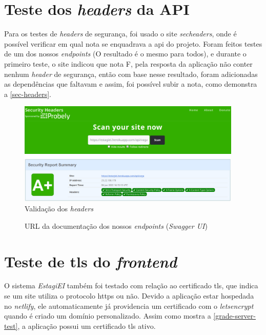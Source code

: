 \section{Teste dos \textit{headers} da API}
Para os testes de \textit{headers} de segurança, foi usado o site \textit{\gls{secheaders}}, onde é possível verificar em qual nota se enquadrava a \ac{api} do projeto. Foram feitos testes de um dos nossos \textit{\glspl{endpoint}} (O resultado é o mesmo para todos), e durante o primeiro teste, o site indicou que nota F, pela resposta da aplicação não conter nenhum \textit{header} de segurança, então com base nesse resultado, foram adicionadas as dependências que faltavam e assim, foi possível subir a nota, como demonstra a \autoref{sec-headers}.

\begin{figure}[H]
	\centering
	\caption{\label{sec-headers}Validação dos \textit{headers}}
	\includegraphics[width=0.95\textwidth]{../imagens/web-tests/grade-security-headers.png}
\end{figure}

\begin{figure}[htb]
	\caption{\label{qr-url-swagger}URL da documentação dos nossos \textit{\glspl{endpoint}} (\textit{Swagger UI})}
	\begin{center}
	\end{center}
\end{figure}

\section{Teste de \ac{tls} do \textit{\gls{frontend}}}
O sistema \emph{EstagiEI} também foi testado com relação ao certificado \ac{tls}, que indica se um site utiliza o protocolo \ac{https} ou não. Devido a aplicação estar hospedada no \textit{\gls{netlify}}, ele automaticamente já providencia um certificado com o \textit{\gls{letsencrypt}} quando é criado um domínio personalizado. Assim como mostra a \autoref{grade-server-test}, a aplicação possui um certificado \ac{tls} ativo.

